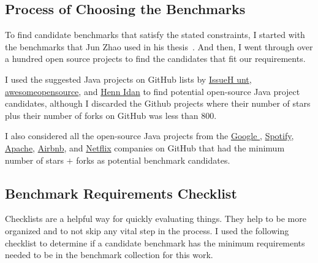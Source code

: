 \subsection{Process of Choosing the Benchmarks}

To find candidate benchmarks that satisfy the stated constraints, I started with the benchmarks that Jun Zhao used in his thesis~\cite{ZhaoJ
un2018}. And then, I went through over a hundred open source projects to find the candidates that fit our requirements.


I used the suggested Java projects on GitHub lists by \href{https://medium.com/issuehunt/50-top-java-projects-on-github-adbfe9f67dbc}{IssueH
unt}, \href{https://awesomeopensource.com/projects/maven-plugin}{awesomeopensource}, and \href{https://www.overops.com/blog/the-hitchhikers-
guide-to-github-13-java-projects-you-should-try/}{Henn Idan} to find potential open-source Java project candidates, although I discarded the
 Github projects where their number of stars plus their number of forks on GitHub was less than 800.

I also considered all the open-source Java projects from the \href{https://github.com/google/?q=&type=&language=java&sort=stargazers}{Google
}, \href{https://github.com/spotify/?q=&type=&language=java&sort=stargazers}{Spotify}, \href{https://github.com/apache/?q=&type=&language=java&sort=stargazers}{Apache}, \href{https://github.com/airbnb/?q=&type=&language=java&sort=stargazers}{Airbnb}, and \href{https://github.com/Netflix?q=&type=&language=java&sort=stargazers}{Netflix} companies on GitHub that had the minimum number of stars $+$ forks as potential benchmark candidates.

\subsection{Benchmark Requirements Checklist}

Checklists are a helpful way for quickly evaluating things. They help to be more organized and to not skip any vital step in the process.  I used the following checklist to determine if a candidate benchmark has the minimum requirements needed to be in the benchmark collection for this work.


